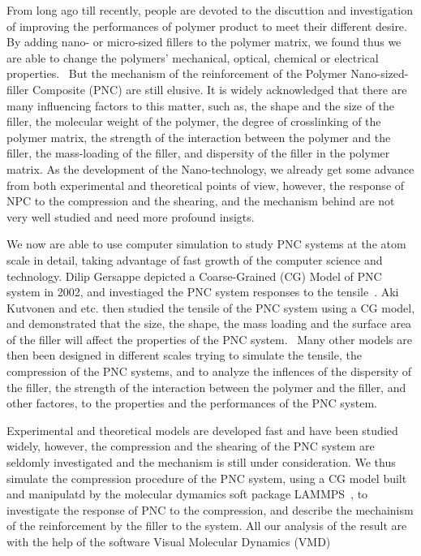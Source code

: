 From long ago till recently, people are devoted to the discuttion and investigation of improving the performances of polymer product to meet their different desire. By adding nano- or micro-sized fillers to the polymer matrix, we found thus we are able to change the polymers' mechanical, optical, chemical or electrical properties.~\cite{Kutvonen2012,Humphrey1996a,Plimpton1995,Yoon2002,Chapman2001,Schmidt2003} But the mechanism of the reinforcement of the Polymer Nano-sized-filler Composite (PNC) are still elusive. It is widely acknowledged that there are many influencing factors to this matter, such as, the shape and the size of the filler, the molecular weight of the polymer, the degree of crosslinking of the polymer matrix, the strength of the interaction between the polymer and the filler, the mass-loading of the filler, and dispersity of the filler in the polymer matrix. As the development of the Nano-technology, we already get some advance from both experimental and theoretical points of view, however, the response of NPC to the compression and the shearing, and the mechanism behind are not very well studied and need more profound insigts. 

We now are able to use computer simulation to study PNC systems at the atom scale in detail, taking advantage of fast growth of the computer science and technology. Dilip Gersappe depicted a Coarse-Grained (CG) Model of PNC system in 2002, and investiaged the PNC system responses to the tensile~\cite{Gersappe2002}. Aki Kutvonen and etc. then studied the tensile of the PNC system using a CG model, and demonstrated that the size, the shape, the mass loading and the surface area of the filler will affect the properties of the PNC system.~\cite{Kutvonen2012,Kutvonen2012a} Many other models are then been designed in different scales trying to simulate the tensile, the compression of the PNC systems, and to analyze the inflences of the dispersity of the filler, the strength of the interaction between the polymer and the filler, and other factores, to the properties and the performances of the PNC system.~\cite{Gersappe2002,Liu2011a,Allegra2008,Brown2008,Brown2003} 

Experimental and theoretical models are developed fast and have been studied widely, however, the compression and the shearing of the PNC system are seldomly investigated and the mechanism is still under consideration. We thus simulate the compression procedure of the PNC system, using a CG model built and manipulatd by the molecular dymamics soft package LAMMPS~\cite{Wu2011}, to investigate the response of PNC to the compression, and describe the mechainism of the reinforcement by the filler to the system. All our analysis of the result are with the help of the software Visual Molecular Dynamics (VMD)~\cite{Hussain2006} 
